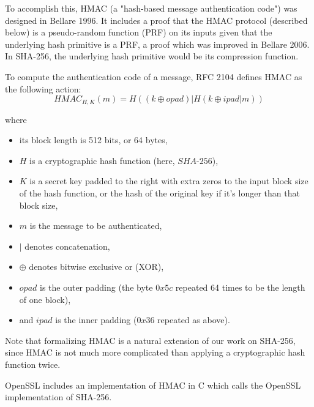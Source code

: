 \documentclass[twocolumn,showpacs,%
  nofootinbib,aps,superscriptaddress,%
  eqsecnum,prd,notitlepage,showkeys,10pt]{revtex4-1}
\begin{document}
To accomplish this, HMAC (a "hash-based message authentication code") was designed in Bellare 1996. It includes a proof that the HMAC protocol (described below) is a pseudo-random function (PRF) on its inputs given that the underlying hash primitive is a PRF, a proof which was improved in Bellare 2006. In SHA-256, the underlying hash primitive would be its compression function.

To compute the authentication code of a message, RFC 2104 defines HMAC as the following action:
$$HMAC_{H, K}(m) = H ( (k \oplus opad) | H ( k \oplus ipad | m )  ) $$

where

\begin{itemize}
\item its block length is 512 bits, or 64 bytes,
\item $H$ is a cryptographic hash function (here, $SHA$-$256$),
\item $K$ is a secret key padded to the right with extra zeros to the input block size of the hash function, or the hash of the original key if it's longer than that block size, 
\item $m$ is the message to be authenticated, 
\item $|$ denotes concatenation, 
\item $\oplus$ denotes bitwise exclusive or (XOR), 
\item $opad$ is the outer padding (the byte $0x5c$ repeated 64 times to be the length of one block), 
\item and $ipad$ is the inner padding ($0x36$ repeated as above).
\end{itemize}

Note that formalizing HMAC is a natural extension of our work on SHA-256, since HMAC is not much more complicated than applying a cryptographic hash function twice. 

OpenSSL includes an implementation of HMAC in C which calls the OpenSSL implementation of SHA-256.
\end{document}
